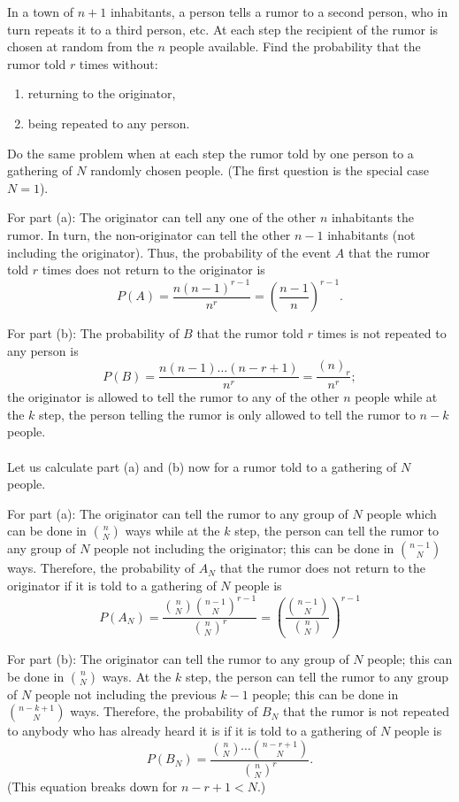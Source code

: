 \begin{problem}
  In a town of \(n+1\) inhabitants, a person tells a rumor to a second
  person, who in turn repeats it to a third person, etc. At each step the
  recipient of the rumor is chosen at random from the \(n\) people
  available. Find the probability that the rumor told \(r\) times without:
  \begin{enumerate}[label=(\alph*),noitemsep]
  \item returning to the originator,
  \item being repeated to any person.
  \end{enumerate}
  Do the same problem when at each step the rumor told by one person to a
  gathering of \(N\) randomly chosen people. (The first question is the
  special case \(N=1\)).
\end{problem}
\begin{solution*}
  For part (a): The originator can tell any one of the other \(n\)
  inhabitants the rumor. In turn, the non-originator can tell the other
  \(n-1\) inhabitants (not including the originator). Thus, the probability
  of the event \(A\) that the rumor told \(r\) times does not return to the
  originator is
  \[
    P(A)=\frac{n(n-1)^{r-1}}{n^r}=\left(\frac{n-1}{n}\right)^{r-1}.
  \]

  For part (b): The probability of \(B\) that the rumor told \(r\) times is
  not repeated to any person is
  \[
    P(B)=\frac{n(n-1)\dotsc(n-r+1)}{n^r}=\frac{(n)_r}{n^r};
  \]
  the originator is allowed to tell the rumor to any of the other \(n\)
  people while at the \(k\) step, the person telling the rumor
  is only allowed to tell the rumor to \(n-k\) people.
  \\\\
  Let us calculate part (a) and (b) now for a rumor told to a gathering of
  \(N\) people.

  For part (a): The originator can tell the rumor to any group of \(N\)
  people which can be done in \(\binom{n}{N}\) ways while at the
  \(k\) step, the person can tell the rumor to any group of
  \(N\) people not including the originator; this can be done in
  \(\binom{n-1}{N}\) ways. Therefore, the probability of \(A_N\) that the
  rumor does not return to the originator if it is told to a gathering of
  \(N\) people is
  \[
    P(A_N)=%
    \frac{\binom{n}{N}\binom{n-1}{N}^{r-1}}{\binom{n}{N}^r}=%
    \left(\frac{\binom{n-1}{N}}{\binom{n}{N}}\right)^{r-1}
  \]

  For part (b): The originator can tell the rumor to any group of \(N\)
  people; this can be done in \(\binom{n}{N}\) ways. At the
  \(k\) step, the person can tell the rumor to any group of
  \(N\) people not including the previous \(k-1\) people; this can be done
  in \(\binom{n-k+1}{N}\) ways. Therefore, the probability of \(B_N\) that
  the rumor is not repeated to anybody who has already heard it is if it is
  told to a gathering of \(N\) people is
  \[
    P(B_N)=\frac{\binom{n}{N}\dotsm\binom{n-r+1}{N}}{\binom{n}{N}^r}.
  \]
  (This equation breaks down for \(n-r+1<N\).)
\end{solution*}

